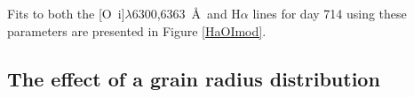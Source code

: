Fits to both the [O~{\sc i}]$\lambda$6300,6363~\AA\ and H$\alpha$ lines for day 714 using these parameters are presented in Figure \ref{HaOImod}.


\subsection{The effect of a grain radius distribution}
\label{gs_distn}

%
%
%
 
%



%
%

